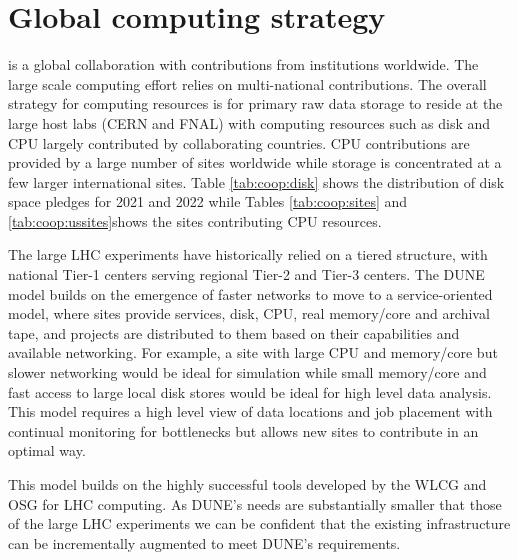 \documentclass[../main-v1.tex]{subfiles}
\begin{document}
\chapter{Global computing strategy}


 is a global collaboration with contributions from institutions worldwide.  The large scale computing effort relies on multi-national contributions. The overall strategy for computing resources is for primary raw data storage to reside at the large host labs (CERN and FNAL) with computing resources such as disk and CPU largely contributed by collaborating countries.   CPU contributions are provided by a large number of sites worldwide while storage is concentrated at a few larger international sites. Table \ref{tab:coop:disk} shows the distribution of disk space pledges for 2021 and 2022 while Tables \ref{tab:coop:sites} and \ref{tab:coop:ussites}shows the sites contributing CPU resources. 

The large LHC experiments have historically relied on a tiered structure, with national Tier-1 centers serving regional Tier-2 and Tier-3 centers.  The DUNE model builds on the emergence of faster networks to move to  a service-oriented model, where sites provide services, disk, CPU, real memory/core and archival tape, and projects are  distributed to them based on their capabilities and available networking.  For example, a site with large CPU and memory/core but slower networking would be ideal for simulation while small memory/core and fast access to large local disk stores would be ideal for high level data analysis.  This model requires a high level view of data locations and job placement with continual monitoring for bottlenecks but allows new sites to contribute in an optimal way. 

This model builds on the highly successful tools developed by the WLCG and OSG for LHC computing.  As DUNE's needs are substantially smaller that those of the large LHC experiments we can be confident that the existing infrastructure can be incrementally augmented to meet DUNE's requirements. 
\end{document}
